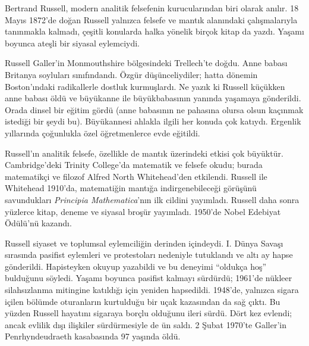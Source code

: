 \documentclass[../../../include/open-logic-section]{subfiles}
\begin{document}



Bertrand Russell, modern analitik felsefenin kurucularından biri olarak
anılır. 18 Mayıs 1872'de doğan Russell yalnızca felsefe ve mantık alanındaki
çalışmalarıyla tanınmakla kalmadı, çeşitli konularda halka yönelik birçok
kitap da yazdı. Yaşamı boyunca ateşli bir siyasal eylemciydi.

Russell Galler'in Monmouthshire bölgesindeki Trellech'te doğdu. Anne babası
Britanya soyluları sınıfındandı. Özgür düşünceliydiler; hatta dönemin
Boston'ındaki radikallerle dostluk kurmuşlardı. Ne yazık ki Russell küçükken
anne babası öldü ve büyükanne ile büyükbabasının yanında yaşamaya gönderildi.
Orada dinsel bir eğitim gördü (anne babasının ne pahasına olursa olsun
kaçınmak istediği bir şeydi bu). Büyükannesi ahlakla ilgili her konuda çok
katıydı. Ergenlik yıllarında çoğunlukla özel öğretmenlerce evde eğitildi.

Russell'ın analitik felsefe, özellikle de mantık üzerindeki etkisi çok
büyüktür. Cambridge'deki Trinity College'da matematik ve felsefe okudu; burada
matematikçi ve filozof Alfred North Whitehead'den etkilendi. Russell ile
Whitehead 1910'da, matematiğin mantığa indirgenebileceği görüşünü savundukları
\emph{Principia Mathematica}'nın ilk cildini yayımladı. Russell daha sonra
yüzlerce kitap, deneme ve siyasal broşür yayımladı. 1950'de Nobel Edebiyat
Ödülü'nü kazandı.

Russell siyaset ve toplumsal eylemciliğin derinden içindeydi. I. Dünya Savaşı
sırasında pasifist eylemleri ve protestoları nedeniyle tutuklandı ve altı ay
hapse gönderildi. Hapisteyken okuyup yazabildi ve bu deneyimi ``oldukça hoş''
bulduğunu söyledi. Yaşamı boyunca pasifist kalmayı sürdürdü; 1961'de nükleer
silahsızlanma mitingine katıldığı için yeniden hapsedildi. 1948'de, yalnızca
sigara içilen bölümde oturanların kurtulduğu bir uçak kazasından da sağ çıktı.
Bu yüzden Russell hayatını sigaraya borçlu olduğunu ileri sürdü. Dört kez
evlendi; ancak evlilik dışı ilişkiler sürdürmesiyle de ün saldı. 2 Şubat
1970'te Galler'in Penrhyndeudraeth kasabasında 97 yaşında öldü.
\end{document}
